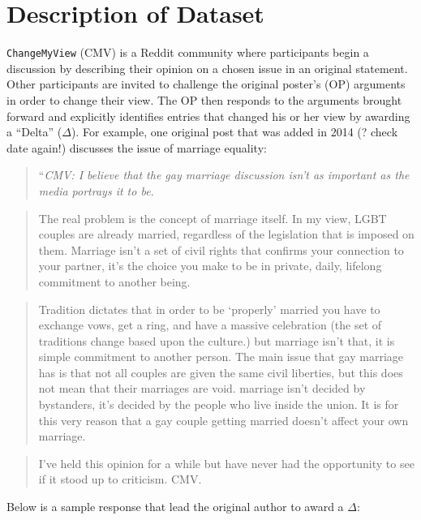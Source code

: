 \section{Description of Dataset}\label{description-of-dataset}

\texttt{ChangeMyView} (CMV) is a Reddit community where participants begin a discussion by describing their opinion on a chosen issue in an original statement. Other participants are invited to challenge the original poster's (OP) arguments in order to change their view. The OP then responds to the arguments brought forward and explicitly identifies entries that changed his or her view by awarding a ``Delta'' (\(\Delta\)). For example, one original post that was added in 2014 (? check date again!) discusses the issue of marriage equality: 

\begin{quote}
``\emph{CMV: I believe that the gay marriage discussion isn't as important as the media portrays it to be.}
\end{quote}

\begin{quote}
The real problem is the concept of marriage itself. In my view, LGBT couples are already married, regardless of the legislation that is imposed on them. Marriage isn't a set of civil rights that confirms your connection to your partner, it's the choice you make to be in private, daily, lifelong commitment to another being.
\end{quote}

\begin{quote}
Tradition dictates that in order to be `properly' married you have to exchange vows, get a ring, and have a massive celebration (the set of traditions change based upon the culture.) but marriage isn't that, it is simple commitment to another person. The main issue that gay marriage has is that not all couples are given the same civil liberties, but this does not mean that their marriages are void. marriage isn't decided by bystanders, it's decided by the people who live inside the union. It is for this very reason that a gay couple getting married doesn't affect your own marriage.
\end{quote}

\begin{quote}
I've held this opinion for a while but have never had the opportunity to see if it stood up to criticism. CMV.
\end{quote}

Below is a sample response that lead the original author to award a \(\Delta\):

